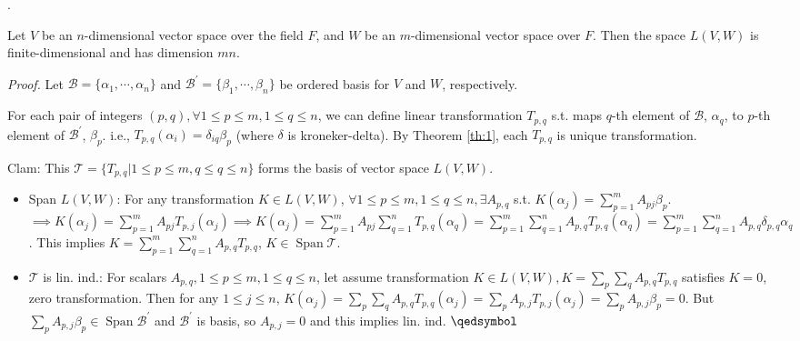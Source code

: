 \documentclass[8pt]{beamer}
\newcommand{\mc}[1]{\mathcal{#1}}
\newcommand{\ti}[1]{\textit{#1}}
\newcommand{\Span}{\operatorname{Span}}
\begin{document}
\begin{frame}{.}
    \begin{theorem} \label{th:5}
        Let $V$ be an $n$-dimensional vector space over the field $F$, and $W$ be an $m$-dimensional vector space over $F$. Then the space $L(V,W)$ is finite-dimensional and has dimension $mn$.
    \end{theorem}

    \ti{Proof.} Let $\mc{B} = \{\alpha_1, \cdots, \alpha_n\}$ and $\mc{B}^\prime = \{\beta_1, \cdots, \beta_n\}$ be ordered basis for $V$ and $W$, respectively.

    For each pair of integers $(p,q), \forall 1 \leq p \leq m, 1 \leq q \leq n$, we can define linear transformation $T_{p,q}$ s.t. maps $q$-th element of $\mc{B}$, $\alpha_q$, to  $p$-th element of $\mc{B}^\prime$, $\beta_p$. i.e., $T_{p,q}(\alpha_i) = \delta_{iq} \beta_p$ (where $\delta$ is kroneker-delta). By Theorem \ref{th:1}, each $T_{p,q}$ is unique transformation.

    Clam: This $\mc{T} = \{T_{p,q}| 1\leq p \leq m, q \leq q \leq n\}$ forms the basis of vector space $L(V,W)$.
    \begin{itemize}
        \item Span $L(V,W)$: For any transformation $K \in L(V,W)$, $\forall 1\leq p \leq m, 1 \leq q \leq n, \exists A_{p,q}$ s.t. $K(\alpha_j) = \sum_{p=1}^m A_{pj} \beta_p$. $\implies K(\alpha_j) = \sum_{p=1}^m A_{pj} T_{p,j}(\alpha_j) \implies K(\alpha_j) = \sum_{p=1}^m A_{pj} \sum_{q=1}^n T_{p,q}(\alpha_q) = \sum_{p=1}^m \sum_{q=1}^n A_{p,q} T_{p,q} (\alpha_q) = \sum_{p=1}^m \sum_{q=1}^n A_{p,q} \delta_{p,q}\alpha_q$. This implies $K = \sum_{p=1}^m \sum_{q=1}^n A_{p,q} T_{p,q}$, $K \in \Span \mc{T}$.
        \item $\mc{T}$ is lin. ind.: For scalars $A_{p,q}, 1\leq p \leq m, 1 \leq q \leq n $, let assume transformation $K \in L(V,W), K = \sum_p \sum_q A_{p,q} T_{p,q}$ satisfies $K = 0$, zero transformation. Then for any $1\leq j \leq n$, $K(\alpha_j) = \sum_{p}\sum_q A_{p,q} T_{p,q} (\alpha_j) = \sum_p A_{p,j} T_{p,j} (\alpha_j) = \sum_p A_{p,j} \beta_p= 0$. But $\sum_p A_{p,j} \beta_p \in \Span \mc{B}^\prime$ and $\mc{B}^\prime$ is basis, so $A_{p,j}=0$ and this implies lin. ind. $\qedsymbol$
    \end{itemize}

\end{frame}
\end{document}
